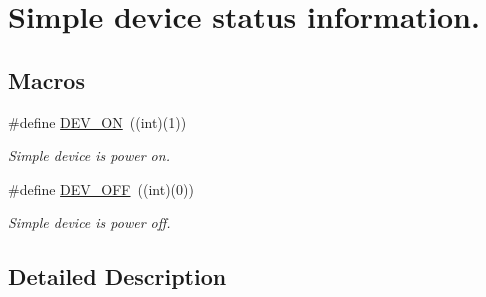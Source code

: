 \hypertarget{group__Dev__Status}{\section{Simple device status information.}
\label{group__Dev__Status}
}
\subsection*{Macros}
\begin{DoxyCompactItemize}
\item 
\hypertarget{group__Dev__Status_ga09d602af4524840941af687c7f903293}{\#define \hyperlink{group__Dev__Status_ga09d602af4524840941af687c7f903293}{D\-E\-V\-\_\-\-O\-N}~((int)(1))}\label{group__Dev__Status_ga09d602af4524840941af687c7f903293}

\begin{DoxyCompactList}\small\item\em Simple device is power on. \end{DoxyCompactList}\item 
\hypertarget{group__Dev__Status_ga2a7db2d5f48e0e31039d767df6b1aed9}{\#define \hyperlink{group__Dev__Status_ga2a7db2d5f48e0e31039d767df6b1aed9}{D\-E\-V\-\_\-\-O\-F\-F}~((int)(0))}\label{group__Dev__Status_ga2a7db2d5f48e0e31039d767df6b1aed9}

\begin{DoxyCompactList}\small\item\em Simple device is power off. \end{DoxyCompactList}\end{DoxyCompactItemize}


\subsection{Detailed Description}
